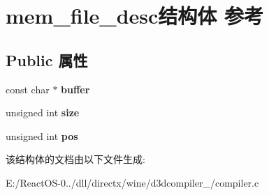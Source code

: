 \hypertarget{structmem__file__desc}{}\section{mem\+\_\+file\+\_\+desc结构体 参考}
\label{structmem__file__desc}
\subsection*{Public 属性}
\begin{DoxyCompactItemize}
\item 
\mbox{\label{structmem__file__desc_a3d62ec90b71dda32668cf25d0516fbc5}} 
const char $\ast$ {\bfseries buffer}
\item 
\mbox{\label{structmem__file__desc_a792396d47eed85abd27b9f90a70e9803}} 
unsigned int {\bfseries size}
\item 
\mbox{\label{structmem__file__desc_a6edded989522729d2c36f205c4512a92}} 
unsigned int {\bfseries pos}
\end{DoxyCompactItemize}


该结构体的文档由以下文件生成\+:\begin{DoxyCompactItemize}
\item 
E\+:/\+React\+O\+S-\/0../dll/directx/wine/d3dcompiler\+\_/compiler.\+c\end{DoxyCompactItemize}
